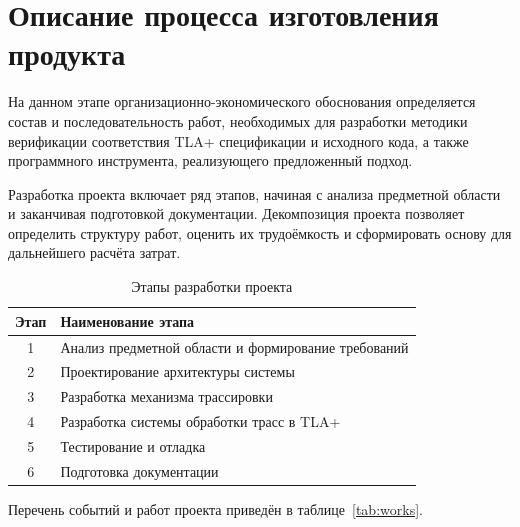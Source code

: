 \section{Описание процесса изготовления продукта}

На данном этапе организационно-экономического обоснования определяется
состав и последовательность работ, необходимых для разработки методики
верификации соответствия TLA+ спецификации и исходного кода, а также
программного инструмента, реализующего предложенный подход.

Разработка проекта включает ряд этапов, начиная с анализа предметной
области и заканчивая подготовкой документации. Декомпозиция проекта
позволяет определить структуру работ, оценить их трудоёмкость и
сформировать основу для дальнейшего расчёта затрат.

\begin{table}[h]
\centering
\caption{Этапы разработки проекта}
\label{tab:stages}
\begin{tabular}{|c|p{10cm}|}
\hline
Этап & Наименование этапа \\ \hline
1 & Анализ предметной области и формирование требований \\ \hline
2 & Проектирование архитектуры системы \\ \hline
3 & Разработка механизма трассировки \\ \hline
4 & Разработка системы обработки трасс в TLA+ \\ \hline
5 & Тестирование и отладка \\ \hline
6 & Подготовка документации \\ \hline
\end{tabular}
\end{table}

Перечень событий и работ проекта приведён в таблице~\ref{tab:works}.

